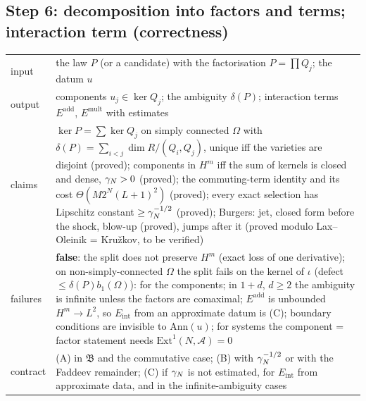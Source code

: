 \subsection*{Step 6: decomposition into factors and terms; interaction term (correctness)}
\begin{tabular}{@{}p{2.2cm}p{9.6cm}@{}}
\toprule
input & the law $P$ (or a candidate) with the factorisation $P=\prod Q_j$; the datum $u$\\
output & components $u_j\in\ker Q_j$; the ambiguity $\delta(P)$; interaction terms $E^{\mathrm{add}}$, $E^{\mathrm{mult}}$ with estimates\\
claims & $\ker P=\sum\ker Q_j$ on simply connected $\Omega$ with $\delta(P)=\sum_{i<j}\dim R/(Q_i,Q_j)$, unique iff the varieties are disjoint (proved); components in $H^m$ iff the sum of kernels is closed and dense, $\gamma_{N}>0$ (proved); the commuting-term identity and its cost $\Theta(M2^N(L+1)^2)$ (proved); every exact selection has Lipschitz constant $\ge\gamma_{N}^{-1/2}$ (proved); Burgers: jet, closed form before the shock, blow-up (proved), jumps after it (proved modulo Lax--Oleinik = Kru\v zkov, to be verified)\\
failures & \textbf{false}: the split does not preserve $H^m$ (exact loss of one derivative); on non-simply-connected $\Omega$ the split fails on the kernel of $\iota$ (defect $\le\delta(P)b_1(\Omega)$): \UND{} for the components; in $1{+}d$, $d\ge2$ the ambiguity is infinite unless the factors are comaximal; $E^{\mathrm{add}}$ is unbounded $H^m\to L^2$, so $E_{\mathrm{int}}$ from an approximate datum is (C); boundary conditions are invisible to $\mathrm{Ann}(u)$; for systems the component = factor statement needs $\mathrm{Ext}^1(N,\mathcal A)=0$\\
contract & (A) in $\mathfrak B$ and the commutative case; (B) with $\gamma_{N}^{-1/2}$ or with the Faddeev remainder; (C) if $\gamma_{N}$ is not estimated, for $E_{\mathrm{int}}$ from approximate data, and in the infinite-ambiguity cases\\
\bottomrule
\end{tabular}

